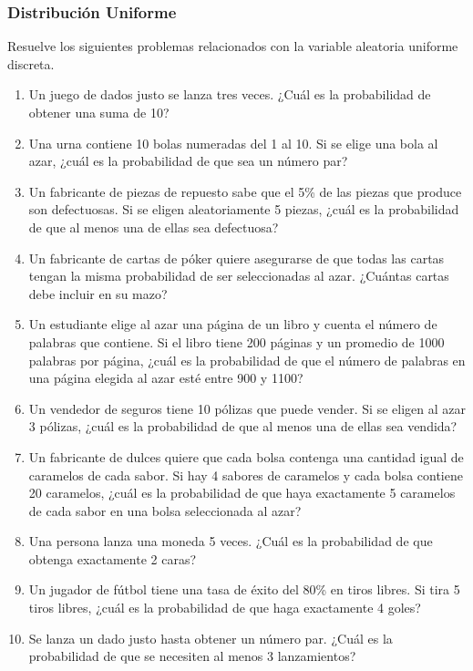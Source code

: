 \subsubsection{Distribución Uniforme}

\begin{Ejer} Resuelve los siguientes problemas relacionados con la variable aleatoria uniforme discreta.

\begin{enumerate}
    \item Un juego de dados justo se lanza tres veces. ¿Cuál es la probabilidad de obtener una suma de 10?
    \item Una urna contiene 10 bolas numeradas del 1 al 10. Si se elige una bola al azar, ¿cuál es la probabilidad de que sea un número par?
    \item Un fabricante de piezas de repuesto sabe que el 5\% de las piezas que produce son defectuosas. Si se eligen aleatoriamente 5 piezas, ¿cuál es la probabilidad de que al menos una de ellas sea defectuosa?
    \item Un fabricante de cartas de póker quiere asegurarse de que todas las cartas tengan la misma probabilidad de ser seleccionadas al azar. ¿Cuántas cartas debe incluir en su mazo?
    \item Un estudiante elige al azar una página de un libro y cuenta el número de palabras que contiene. Si el libro tiene 200 páginas y un promedio de 1000 palabras por página, ¿cuál es la probabilidad de que el número de palabras en una página elegida al azar esté entre 900 y 1100?
    \item Un vendedor de seguros tiene 10 pólizas que puede vender. Si se eligen al azar 3 pólizas, ¿cuál es la probabilidad de que al menos una de ellas sea vendida?
    \item Un fabricante de dulces quiere que cada bolsa contenga una cantidad igual de caramelos de cada sabor. Si hay 4 sabores de caramelos y cada bolsa contiene 20 caramelos, ¿cuál es la probabilidad de que haya exactamente 5 caramelos de cada sabor en una bolsa seleccionada al azar?
    \item Una persona lanza una moneda 5 veces. ¿Cuál es la probabilidad de que obtenga exactamente 2 caras?
    \item Un jugador de fútbol tiene una tasa de éxito del 80\% en tiros libres. Si tira 5 tiros libres, ¿cuál es la probabilidad de que haga exactamente 4 goles?
    \item Se lanza un dado justo hasta obtener un número par. ¿Cuál es la probabilidad de que se necesiten al menos 3 lanzamientos?
\end{enumerate}
\end{Ejer}
